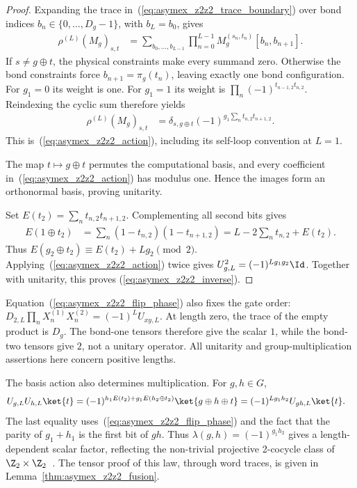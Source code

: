 \begin{proof}
    \leanok
    Expanding the trace in~(\ref{eq:asymex_z2z2_trace_boundary})
    over bond indices $b_n\in\{0,\ldots,D_g-1\}$, with $b_L=b_0$, gives
    \begin{align}
        \rho^{(L)}(M_g)_{s,t}
         & =\sum_{b_0,\ldots,b_{L-1}}
        \prod_{n=0}^{L-1}
        M_g^{(s_n,t_n)}[b_n,b_{n+1}].
        \label{eq:asymex_z2z2_cyclic}
    \end{align}
    If $s\neq g\oplus t$, the physical constraints make every summand
    zero. Otherwise the bond constraints force
    $b_{n+1}=\pi_g(t_n)$, leaving exactly one bond configuration.
    For $g_1=0$ its weight is one. For $g_1=1$ its weight is
    $\prod_n(-1)^{t_{n-1,2}t_{n,2}}$.
    Reindexing the cyclic sum therefore yields
    \begin{align}
        \rho^{(L)}(M_g)_{s,t}
         & =\delta_{s,g\oplus t}
        (-1)^{g_1\sum_n t_{n,2}t_{n+1,2}}.
        \label{eq:asymex_z2z2_kernel}
    \end{align}
    This is~(\ref{eq:asymex_z2z2_action}), including its self-loop
    convention at $L=1$.

    The map $t\mapsto g\oplus t$ permutes the computational basis,
    and every coefficient in~(\ref{eq:asymex_z2z2_action}) has
    modulus one. Hence the images form an orthonormal basis, proving
    unitarity.

    Set $E(t_2)=\sum_n t_{n,2}t_{n+1,2}$. Complementing all second
    bits gives
    \begin{align}
        E(1\oplus t_2)
         & =\sum_n(1-t_{n,2})(1-t_{n+1,2})
        =L-2\sum_n t_{n,2}+E(t_2).
        \label{eq:asymex_z2z2_flip_phase}
    \end{align}
    Thus $E(g_2\oplus t_2)\equiv E(t_2)+Lg_2\pmod 2$.
    Applying~(\ref{eq:asymex_z2z2_action}) twice gives
    $U_{g,L}^2=(-1)^{Lg_1g_2}\Id$.
    Together with unitarity, this proves
    (\ref{eq:asymex_z2z2_inverse}).
\end{proof}

Equation~(\ref{eq:asymex_z2z2_flip_phase}) also fixes the gate order:
$D_{2,L}\prod_nX_n^{(1)}X_n^{(2)}
    =(-1)^LU_{xy,L}$.
At length zero, the trace of the empty product is $D_g$.
The bond-one tensors therefore give the scalar $1$, while the
bond-two tensors give $2$, not a unitary operator.
All unitarity and group-multiplication assertions here concern
positive lengths.

The basis action also determines multiplication. For $g,h\in G$,
\begin{align}
    U_{g,L}U_{h,L}\ket{t}
     & =(-1)^{h_1E(t_2)+g_1E(h_2\oplus t_2)}
    \ket{g\oplus h\oplus t}
    =(-1)^{Lg_1h_2}U_{gh,L}\ket{t}.
    \label{eq:asymex_z2z2_basis_product}
\end{align}
The last equality uses~(\ref{eq:asymex_z2z2_flip_phase}) and the
fact that the parity of $g_1+h_1$ is the first bit of $gh$.
Thus $\lambda(g,h)=(-1)^{g_1h_2}$ gives a length-dependent
scalar factor, reflecting the non-trivial projective 2-cocycle class of
$\Z_2\times\Z_2$~\cite{ChenGuWen2011,GarreRubio2023MPOSym}.
The tensor proof of this law, through word traces,
is given in Lemma~\ref{thm:asymex_z2z2_fusion}.

